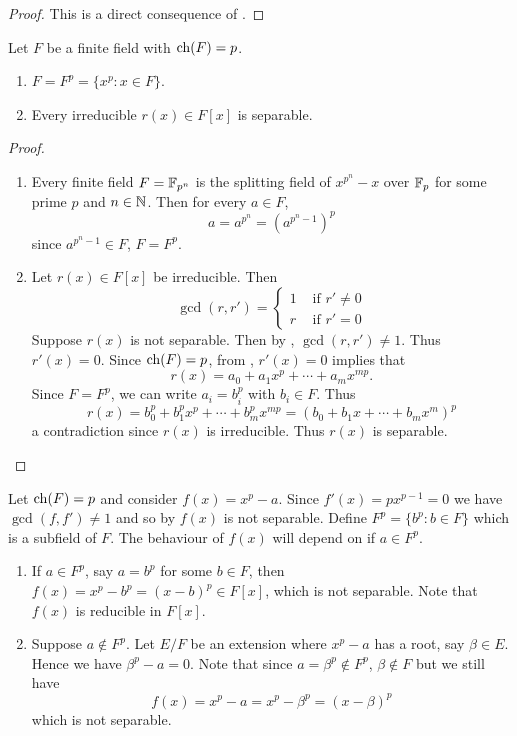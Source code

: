 \documentclass[11pt]{article}
\begin{document}
\begin{proof}
    This is a direct consequence of .
    
\end{proof}

\begin{corollary}
    Let $F$ be a finite field with $\operatorname{ch}(F)=p$.
    \begin{enumerate}
        \item $F=F^p=\{x^p:x\in F\}$.
        \item Every irreducible $r(x)\in F[x]$ is separable.
    \end{enumerate}
\end{corollary}

\begin{proof}\,
    \begin{enumerate}
        \item Every finite field $F=\mathbb{F}_{p^n}$ is the splitting field of $x^{p^n}-x$ over $\mathbb{F}_p$ for some prime $p$ and $n\in\mathbb{N}$. Then for every $a\in F$,
        \[a=a^{p^n}=(a^{p^n-1})^p\]
        since $a^{p^n-1}\in F$, $F=F^p$.
        \item Let $r(x)\in F[x]$ be irreducible. Then
        \[\gcd(r,r')=\begin{cases}
            1 & \text{ if }r'\neq0 \\ r & \text{ if }r'=0
        \end{cases}\]
        Suppose $r(x)$ is not separable. Then by , $\gcd(r,r')\neq1$. Thus $r'(x)=0$. Since $\operatorname{ch}(F)=p$, from , $r'(x)=0$ implies that
        \[r(x)=a_0+a_1x^p+\cdots+a_mx^{mp}.\]
        Since $F=F^p$, we can write $a_i=b_i^p$ with $b_i\in F$. Thus
        \[r(x)=b_0^p+b_1^px^p+\cdots+b_m^px^{mp}=(b_0+b_1x+\cdots+b_mx^m)^p\]
        a contradiction since $r(x)$ is irreducible. Thus $r(x)$ is separable.
    \end{enumerate}
\end{proof}

\begin{example}
    Let $\operatorname{ch}(F)=p$ and consider $f(x)=x^p-a$. Since $f'(x)=px^{p-1}=0$ we have $\gcd(f,f')\neq1$ and so by  $f(x)$ is not separable. Define $F^p=\{b^p:b\in F\}$ which is a subfield of $F$. The behaviour of $f(x)$ will depend on if $a\in F^p$.
    \begin{enumerate}
        \item If $a\in F^p$, say $a=b^p$ for some $b\in F$, then $f(x)=x^p-b^p=(x-b)^p\in F[x]$, which is not separable. Note that $f(x)$ is reducible in $F[x]$.
        \item Suppose $a\not\in F^p$. Let $E/F$ be an extension where $x^p-a$ has a root, say $\beta\in E$. Hence we have $\beta^p-a=0$. Note that since $a=\beta^p\not\in F^p$, $\beta\not\in F$ but we still have
        \[f(x)=x^p-a=x^p-\beta^p=(x-\beta)^p\]
        which is not separable.
    \end{enumerate}
\end{example}
\end{document}
